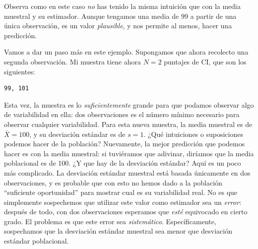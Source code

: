 \documentclass[spanish,]{book}
\begin{document}
Observa como en este caso \emph{no} has tenido la misma intuición que
con la media muestral y su estimador. Aunque tengamos una media de 99 a
partir de una única observación, es un valor \emph{plausible}, y nos
permite al menos, hacer una predicción.

Vamos a dar un paso más en este ejemplo. Supongamos que ahora recolecto
una segunda observación. Mi muestra tiene ahora \(N=2\) puntajes de CI,
que son los siguientes:

\begin{verbatim}
99, 101
\end{verbatim}

Esta vez, la muestra es lo \emph{suficientemente} grande para que
podamos observar algo de variabilidad en ella: dos observaciones es el
número mínimo necesario para observar cualquier variabilidad. Para esta
nueva muestra, la media muestral es de \(\bar{X}=100\), y su desviación
estándar es de \(s=1\). ¿Qué intuiciones o suposiciones podemos hacer de
la población? Nuevamente, la mejor predicción que podemos hacer es con
la media muestral: si tuviéramos que adivinar, diríamos que la media
poblacional es de 100. ¿Y que hay de la desviación estándar? Aquí es un
poco más complicado. La desviación estándar muestral está basada
únicamente en dos observaciones, y es probable que con esto no hemos
dado a la población ``suficiente oportunidad'' para mostrar cual es su
variabilidad real. No es que simplemente sospechemos que utilizar este
valor como estimador sea un \emph{error}: después de todo, con dos
observaciones esperamos que \emph{esté} equivocado en cierto grado. El
problema es que este error sea \emph{sistemático}. Específicamente,
sospechamos que la desviación estándar muestral sea menor que desviación
estándar poblacional.
\end{document}
